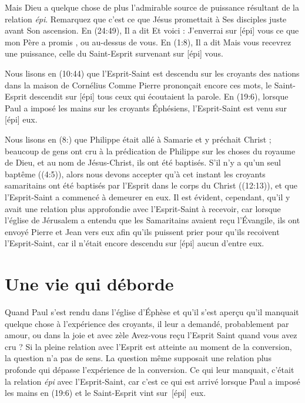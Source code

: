 Mais Dieu a quelque chose de plus \ocadr l'admirable source de puissance
 résultant de la relation \emph{épi}.
 Remarquez que c'est ce que Jésus promettait à Ses disciples juste avant
 Son ascension. En (24:49), Il a dit\frcolon{}
 \Og Et voici : J'enverrai sur [épi] vous ce que mon Père a promis \Fg{},
 ou \Og au-dessus de vous. \Fg{}
 En (1:8), Il a dit\frcolon{}
 \Og Mais vous recevrez une puissance, celle du Saint-Esprit survenant
 sur [épi] vous. \Fg{}

Nous lisons en (10:44) que l'Esprit-Saint est descendu
 \Og sur \Fg{} les croyants des nations dans la maison de Cornélius\frcolon{}
 \Og Com\-me Pierre prononçait encore ces mots, le Saint-Esprit descendit
 sur [épi] tous ceux qui écoutaient la parole. \Fg{}
 En (19:6), lorsque Paul a imposé les mains sur les
 croyants Éphésiens, l'Esprit-Saint est venu sur [épi] eux.

Nous lisons en (8:) que Philippe était allé à Samarie
 et y préchait Christ ; beaucoup de gens ont cru à la prédication de Philippe
 sur les choses du royaume de Dieu, et au nom de Jésus-Christ,
 ils ont été baptisés.
 S'il n'y a qu'un seul baptême ((4:5)),
 alors nous devons accepter qu'à cet instant les croyants samaritains
 ont été baptisés par l'Esprit dans le corps du Christ
 ((12:13)), et que l'Esprit-Saint a commencé à demeurer
 en eux. Il est évident, cependant, qu'il y avait une relation plus approfondie
 avec l'Esprit-Saint à recevoir, car lorsque l'église de Jérusalem a entendu
 que les Samaritains avaient reçu l'Évangile, ils ont envoyé Pierre et Jean
 vers eux afin qu'ils puissent prier pour qu'ils recoivent l'Esprit-Saint,
 car il n'était encore descendu sur [épi] aucun d'entre eux.

\section{Une vie qui d\'eborde}

Quand Paul s'est rendu dans l'église d'Éphèse et qu'il s'est aperçu
 qu'il manquait quelque chose à l'expérience des croyants, 
 il leur a demandé,
 probablement par amour, ou dans la joie et avec zèle\frcolon{}
 \Og Avez-vous reçu l'Esprit Saint quand vous avez cru ? \Fg{}
 Si la pleine relation avec l'Esprit est atteinte au moment de
 la conversion, la question n'a pas de sens.
 La question même supposait une relation plus profonde qui dépasse
 l'expérience  de la conversion.
 Ce qui leur manquait, c'était la relation
 \emph{épi} avec l'Es\-prit-Saint, car c'est ce qui
 est arrivé lorsque Paul a imposé les mains en (19:6)\frcolon{}
 \Og et le Saint-Esprit vint sur~[épi]~eux. \Fg{}

